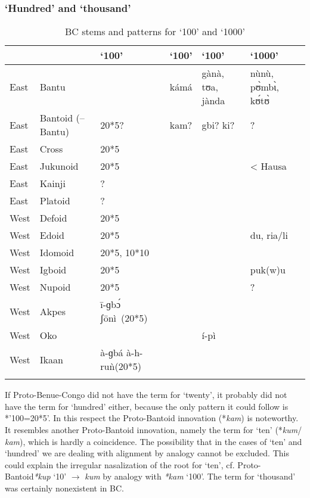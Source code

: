 \clearpage
\subsubsection{‘Hundred’ and ‘thousand’}\label{sec:3.1.4.10}
\begin{table}
\caption{\label{tab:3:63}BC stems and patterns for `100'  and `1000'}


\begin{tabularx}{\textwidth}{lQ QllQ}
\lsptoprule

~ & \textbf{~} & `100' & `100' & `100' & `1000' \\
\midrule
East & {Bantu} &   & kámá & gànà, tʊa, jànda & nùnù, p{\`{ʊ}}mb{\`{ɩ}}, k{\'{ʊ}}t{\`{ʊ}}\\
East & {Bantoid} {(–Bantu)} & 20*5? & kam? & gbi? ki? &?\\
East & {Cross} & 20*5 &   &   &  \\
East & {Jukunoid} & 20*5 &   &   & < Hausa\\
East & {Kainji} & ? &   &   &  \\
East & {Platoid} & ? &   &   &  \\
West & {Defoid} & 20*5 &   &   &  \\
West & {Edoid} & 20*5 &   &   & du, ria/li\\
West & {Idomoid} & 20*5, 10*10 &   &   &  \\
West & {Igboid} & 20*5 &   &   & puk(w)u\\
West & {Nupoid} & 20*5 &   &   & ?\\
West & {Akpes} & {\={i}}-ɡb{\'{ɔ}} ʃ{\={o}}nì~(20*5) &   &   &  \\
West & {Oko} &   &   & í-pì &  \\
West & {Ikaan} & à-ɡbá à-h-ruǹ(20*5) &   &   &  \\
\lspbottomrule
\end{tabularx}
\end{table}

If Proto-Benue-Congo did not have the term for ‘twenty’, it probably did not have the term for ‘hundred’ either, because the only pattern it could follow is *’100=20*5’. In this respect the Proto-Bantoid innovation (*\textit{kam}) is noteworthy. It resembles another Proto-Bantoid innovation, namely the term for ‘ten’ (*\textit{kum}/ \textit{kam}), which is hardly a coincidence. The possibility that in the cases of ‘ten’ and ‘hundred’ we are dealing with alignment by analogy cannot be excluded. This could explain the irregular nasalization of the root for ‘ten’, cf. Proto-Bantoid\textit{*kup} ‘10’ ${\rightarrow}$ \textit{kum} by analogy with \textit{*kam} ‘100’.
The term for ‘thousand’ was certainly nonexistent in BC.

